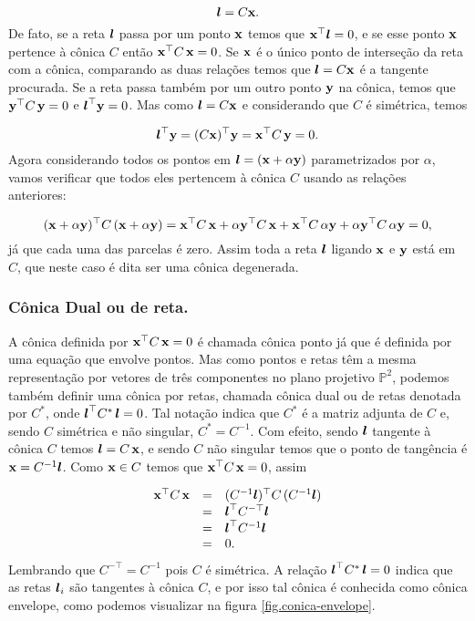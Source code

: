 \begin{equation*}
\boldsymbol{l}=C\mathbf{x}.
\end{equation*}
De fato, se a reta $\boldsymbol{l}$ passa por um ponto $\mathbf{x}$ temos que $\mathbf{x}^\top\boldsymbol{l}=0$, e se esse ponto $\mathbf{x}$ pertence à cônica $C$ então $\mathbf{x}^\top C\,\mathbf{x}=0$. Se $\mathbf{x}$ é o único ponto de interseção da reta com a cônica, comparando as duas relações  temos que $\boldsymbol{l}=C\mathbf{x}$ é a tangente procurada. Se a reta passa também por um outro ponto ${\bf y}$ na cônica, temos que ${\bf y}^\top C\,{\bf y}=0$ e $\boldsymbol{l}^\top{\bf y}=0$. Mas como $\boldsymbol{l}=C\mathbf{x}$ e considerando que $C$ é simétrica, temos

\begin{equation*}
\boldsymbol{l}^\top{\bf y}=(C\mathbf{x})^\top{\bf y}=\mathbf{x}^\top C\,{\bf y}=0.
\end{equation*}  
Agora considerando todos os pontos em $\boldsymbol{l}=(\mathbf{x}+\alpha{\bf y})$ parametrizados por $\alpha$, vamos verificar que todos eles pertencem à cônica $C$ usando as relações anteriores:

\begin{equation*}
(\mathbf{x}+\alpha{\bf y})^\top C\,(\mathbf{x}+\alpha{\bf y})=\mathbf{x}^\top C\,\mathbf{x}+\alpha{\bf y}^\top C\,\mathbf{x}+\mathbf{x}^\top C\,\alpha{\bf y}+\alpha{\bf y}^\top C\,\alpha{\bf y}=0,
\end{equation*}
já que cada uma das parcelas é zero. Assim toda a reta $\boldsymbol{l}$ ligando $\mathbf{x}$ e ${\bf y}$ está em $C$, que neste caso é dita ser uma cônica degenerada.\\

\subsubsection{Cônica Dual ou de reta.}\label{sec.conica-dual} 

A cônica definida por $\mathbf{x}^\top C\,\mathbf{x}=0$ é chamada cônica ponto já que é definida por uma equação que envolve pontos. Mas como pontos e retas têm a mesma representação por vetores de três componentes no plano projetivo $\mathbb{P}^2$, podemos também definir uma cônica por retas, chamada cônica dual ou de retas denotada por $C^*$, onde $\boldsymbol{l}^\top C^*\,\boldsymbol{l}=0$. Tal notação indica que $C^*$ é a matriz adjunta de $C$ e, sendo $C$ simétrica e não singular, $C^*=C^{-1}$. Com efeito, sendo $\boldsymbol{l}$ tangente à cônica $C$ temos $\boldsymbol{l}=C\,\mathbf{x}$, e sendo $C$ não singular temos que o ponto de tangência é $\mathbf{x}=C^{-1}\boldsymbol{l}$. Como $\mathbf{x}\in C$ temos que $\mathbf{x}^\top C\,\mathbf{x}=0$, assim

\begin{equation*}
\begin{array}{rcl}
\mathbf{x}^\top C\,\mathbf{x}&=&(C^{-1}\boldsymbol{l})^\top C\,(
C^{-1}\boldsymbol{l})\\
&=&\boldsymbol{l}^\top C^{-\top}\boldsymbol{l}\\
&=&\boldsymbol{l}^\top C^{-1}\boldsymbol{l}\\
&=&0.
\end{array}
\end{equation*}
Lembrando que $C^{-\top}=C^{-1}$ pois $C$ é simétrica. A relação $\boldsymbol{l}^\top C^*\,\boldsymbol{l}=0$ indica que as retas $\boldsymbol{l}_i$ são tangentes à cônica $C$, e por isso tal cônica é conhecida como cônica envelope, como podemos visualizar na figura \ref{fig.conica-envelope}.

